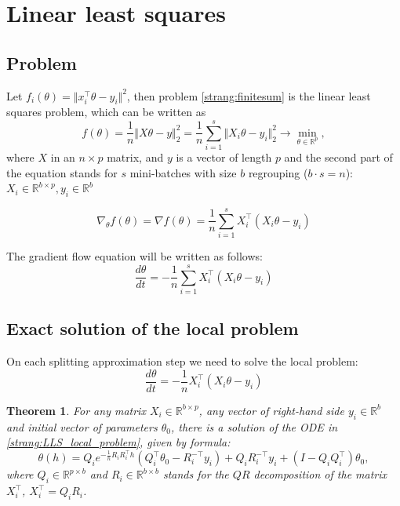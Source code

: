 \documentclass{article} %
\newtheorem{theorem}{Theorem}
\begin{document}
\section{Linear least squares}
\subsection{Problem}
Let $f_i(\theta) = \Vert x_i^{\top} \theta - y_i \Vert^2$, then problem \eqref{strang:finitesum} is the linear least squares problem, which can be written as
\begin{equation}\label{strang:LLS}
   f(\theta) = \dfrac{1}{n}\Vert X \theta - y \Vert_2^2  = \dfrac{1}{n}\sum\limits_{i=1}^s\Vert X_i \theta - y_i \Vert_2^2\to \min_{\theta \in \mathbb{R}^p},
\end{equation}
where $X$ in an $n \times p$ matrix, and $y$ is a vector of length $p$ and the second part of the equation stands for $s$ mini-batches with size $b$ regrouping ($b \cdot s = n$): $X_i \in \mathbb{R}^{b \times p}, y_i \in \mathbb{R}^{b}$

\begin{equation}\label{strang:LLS_grad}
\nabla_\theta f(\theta) = \nabla f(\theta) = \dfrac{1}{n}\sum\limits_{i=1}^s X_i^\top( X_i \theta - y_i)
\end{equation}

The gradient flow equation will be written as follows:
\begin{equation}\label{strang:LLS_GF}
\dfrac{d \theta}{d t} = - \dfrac{1}{n}\sum\limits_{i=1}^s X_i^\top( X_i \theta - y_i)
\end{equation}

\subsection{Exact solution of the local problem}
On each splitting approximation step we need to solve the local problem:
\begin{equation}\label{strang:LLS_local_problem}
\dfrac{d \theta}{d t} = - \dfrac{1}{n} X_i^\top( X_i \theta - y_i)
\end{equation}
\begin{theorem}\label{strang:LLS_local_solution} For any matrix $X_i \in \mathbb{R}^{b \times p}$, any vector of right-hand side $y_i \in \mathbb{R}^{b}$ and initial vector of parameters $\theta_0$, there is a solution of the ODE in \ref{strang:LLS_local_problem}, given by formula:
$$
\theta(h) = Q_i e^{-\frac{1}{n}R_iR_i^\top h} \left( Q_i^\top \theta_0 - R_i^{-\top}y_i\right) + Q_iR_i^{-\top}y_i + (I - Q_iQ_i^\top)\theta_0,
$$ 
where $Q_i \in \mathbb{R}^{p \times b}$ and $R_i \in \mathbb{R}^{b \times b}$ stands for the $QR$ decomposition of the matrix $X_i^\top$, $X_i^\top = Q_i R_i$.
\end{theorem}
\end{document}
